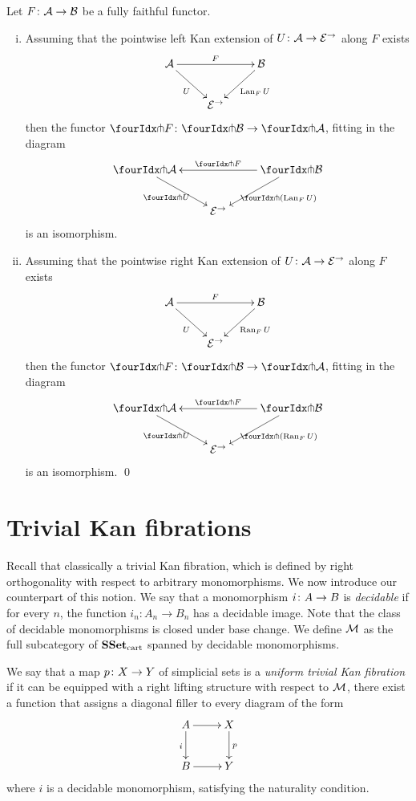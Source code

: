 \documentclass[reqno,10pt,a4paper,oneside]{amsart}
\begin{document}
\begin{proposition} Let $F \co \cal{A} \to \cal{B}$ be a fully faithful functor. 
\label{kan-extension-closure}
\begin{enumerate}[(i)]
\item Assuming that the pointwise left Kan extension of 
$U \co \cal{A} \to \catE^{\to}$ along $F$ exists
\[
\xymatrix{
  \cal{A}
  \ar[dr]_{U}
  \ar[rr]^{F}
&&
  \cal{B}
  \ar[dl]^{\Lan_F U}
\\&
  \catE^{\to}
}
\]
then the functor $\liftr{F} \co \liftr{\cal{B}} \to \liftr{\cal{A}}$,  fitting in the diagram
\[
\xymatrix{
  \liftr{\cal{A}}
  \ar[dr]_{\liftr{U}}
&&
  \liftr{\cal{B}}
  \ar[ll]_{\liftr{F}}
  \ar[dl]^{\liftr{(\Lan_F U)}}
\\&
  \catE^{\to}
}
\]
is an isomorphism.
\item Assuming that the pointwise right Kan extension of 
$U \co \cal{A} \to \catE^{\to}$ along $F$ exists
\[
\xymatrix{
  \cal{A}
  \ar[dr]_{U}
  \ar[rr]^{F}
&&
  \cal{B}
  \ar[dl]^{\Ran_F U}
\\&
  \catE^{\to}
}
\]
then the functor $\liftl{F} \co \liftl{\cal{B}} \to \liftl{\cal{A}}$, fitting in the diagram
\[
\xymatrix{
  \liftl{\cal{A}}
  \ar[dr]_{\liftl{U}}
&&
  \liftl{\cal{B}}
  \ar[ll]_{\liftl{F}}
  \ar[dl]^{\liftl{(\Ran_F U)}}
\\&
  \catE^{\to}
}
\]
is an isomorphism. \qed
\end{enumerate}
\end{proposition}








\section{Trivial Kan fibrations}

Recall that classically a trivial Kan fibration, which is defined by right orthogonality with respect to arbitrary monomorphisms. We now introduce our counterpart of this notion. We say that a monomorphism 
$i \co A \to B$ is  \emph{decidable} if for every $n$, the function $i_n : A_n \to B_n$ has a decidable image. 
Note that the class of decidable monomorphisms is closed under base change. We define $\cal{M}$ as the full subcategory of $\SSet_\cart$ spanned by decidable monomorphisms. 

\begin{definition} We say that a map $p \co X \to Y$ of simplicial sets is a \emph{uniform trivial Kan fibration}
 if it can be equipped with a right lifting structure with respect to $\cal{M}$, \ie there exist a function that 
 assigns a diagonal filler to every diagram of the form
 \[
 \xymatrix{
 A \ar[r] \ar[d]_i & X \ar[d]^p \\
 B \ar[r] & Y}
 \]
 where $i$ is a decidable monomorphism, satisfying the naturality condition. 
 \end{definition} 
 
\end{document}
